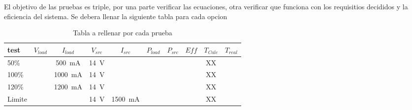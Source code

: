 
El objetivo de las pruebas es triple, por una parte verificar las ecuaciones, otra verificar que funciona con los requisitios decididos y la eficiencia del sistema.
Se debera llenar la siguiente tabla para cada opcion

\begin{table}[H]
    \centering
    \renewcommand\theadfont{\bfseries}
    \setlength{\tabcolsep}{10pt}
    \renewcommand{\arraystretch}{1.5}
    \begin{tabular}{|l|c|c|c|c|c|c|c|c|c|}
        \hline
        test   & $V_{load}$ & $I_{load}$               & $V_{src}$      & $I_{src}$                & $P_{load}$ & $P_{src}$ & $Eff$ & $T_{Calc}$ & $T_{real}$ \\ \hline
        50\%   &            & \SI{500}{\milli\ampere}  & \SI{14}{\volt} &                          &            &           &       & XX         &            \\ \hline

        100\%  &            & \SI{1000}{\milli\ampere} & \SI{14}{\volt} &                          &            &           &       & XX         &            \\ \hline

        120\%  &            & \SI{1200}{\milli\ampere} & \SI{14}{\volt} &                          &            &           &       & XX         &            \\ \hline

        Limite &            &                          & \SI{14}{\volt} & \SI{1500}{\milli\ampere} &            &           &       & XX         &            \\

        \hline
    \end{tabular}

    \caption{Tabla a rellenar por cada prueba}
    \label{tab:exampleDataLab}
\end{table}

